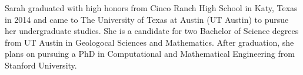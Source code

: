 Sarah graduated with high honors from Cinco Ranch High School in Katy, Texas in 2014 and came to The University of Texas at Austin (UT Austin) to pursue her undergraduate studies. 
She is a candidate for two Bachelor of Science degrees from UT Austin in Geologocal Sciences and Mathematics. 
After graduation, she plans on pursuing a PhD in Computational and Mathematical Engineering from Stanford University.
